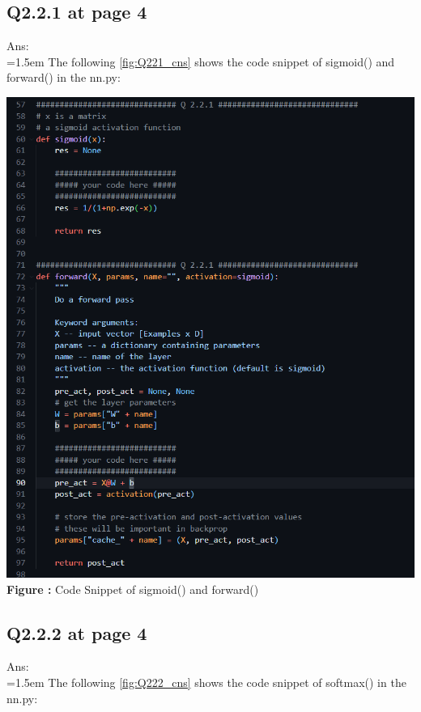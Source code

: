 \documentclass{article}
\begin{document}
	\newpage
	\subsection*{Q2.2.1 at page 4}
	Ans:\\
	\hangindent=1.5em \hspace{1.5em}  The following \autoref{fig:Q221_cns} shows the code snippet of sigmoid() and forward() in the nn.py:
	\newline
	
	\begin{minipage}{1\linewidth}
		\centering
		\hspace{0.12\linewidth} 
		\includegraphics[width=0.7\linewidth]{./Q221_cns.png}  %
		\newline
		\textbf{Figure \thefigure:} Code Snippet of sigmoid() and forward()%
		\label{fig:Q221_cns}  %
	\end{minipage}	
	
	\newpage
	\subsection*{Q2.2.2 at page 4}
	Ans:\\
	\hangindent=1.5em \hspace{1.5em}  The following \autoref{fig:Q222_cns} shows the code snippet of softmax() in the nn.py:
	\newline
\end{document}
